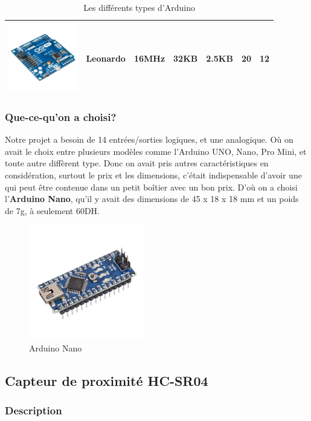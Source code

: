\begin{table}[hbt!]
\begin{tabular}{|C{3cm}|C{2cm}|C{2.2cm}|C{2.2cm}|C{1.2cm}|C{1.5cm}|C{1.2cm}|}
        \hline
        \includegraphics[width=3cm]{assets/arduino/pro.png} & Leonardo & 16MHz & 32KB & 2.5KB & 20 & 12 \\
        \hline
    \end{tabular}
    \caption{Les différents types d'Arduino \cite{arduino-types}}
\end{table}

\FloatBarrier

\subsubsection{Que-ce-qu'on a choisi?}

Notre projet a besoin de 14 entrées/sorties logiques, et une analogique. Où on avait le choix entre plusieurs modèles comme l'Arduino UNO, Nano, Pro Mini, et toute autre diffèrent type. Donc on avait pris autres caractéristiques en considération, surtout le prix et les dimensions, c'était indispensable d'avoir une qui peut être contenue dans un petit boîtier avec un bon prix. D'où on a choisi l'\textbf{Arduino Nano}, qu'il y avait des dimensions de 45 x 18 x 18 mm et un poids de 7g, à seulement 60DH.


\begin{figure}[hbt!]
    \centering
    \includegraphics[width=5cm]{assets/arduino/nano.png}
    \caption{Arduino Nano}
\end{figure}

\subsection{Capteur de proximité HC-SR04}

\subsubsection{Description}

